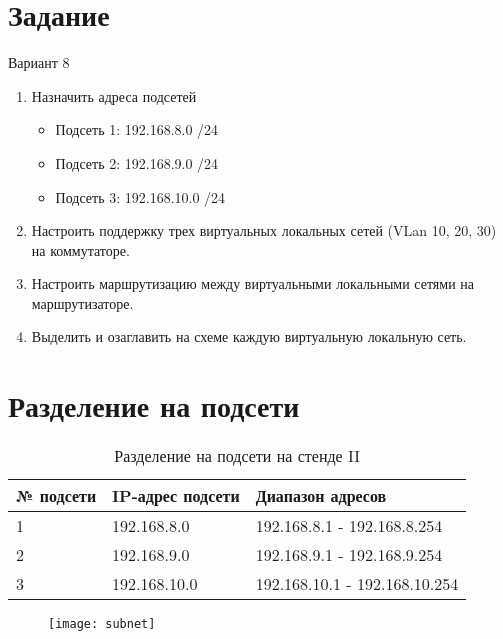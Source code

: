 \documentclass[a4paper, 14pt]{article}
\begin{document}
\section*{Задание}

Вариант 8 

\begin{enumerate}

\item Назначить адреса подсетей
\begin{itemize}
\item	Подсеть 1: 192.168.8.0 /24
\item Подсеть 2: 192.168.9.0 /24
\item	Подсеть 3: 192.168.10.0 /24
\end{itemize}

\item Настроить поддержку трех виртуальных локальных сетей (VLan 10, 20, 30) на коммутаторе.

\item Настроить маршрутизацию между виртуальными локальными сетями на маршрутизаторе.

\item Выделить и озаглавить на схеме каждую виртуальную локальную сеть.

\end{enumerate}

\section*{Разделение на подсети}

\begin{table}[H]
    \centering
    \caption{Разделение на подсети на стенде II}
    \begin{tabular}{|p{0.8cm}|p{3cm}|p{6cm}|}
        \hline
        № подсети & IP-адрес подсети & Диапазон адресов  \\
        \hline
        1 & 192.168.8.0 & 192.168.8.1 - 192.168.8.254  \\
        \hline
        2 & 192.168.9.0 & 192.168.9.1 - 192.168.9.254  \\
        \hline
        3 & 192.168.10.0 & 192.168.10.1 - 192.168.10.254  \\
        \hline
    \end{tabular}
\end{table}

\begin{figure}[H]
    \texttt{[image: subnet]}
    \label{fig:1}
\end{figure}
\end{document}
